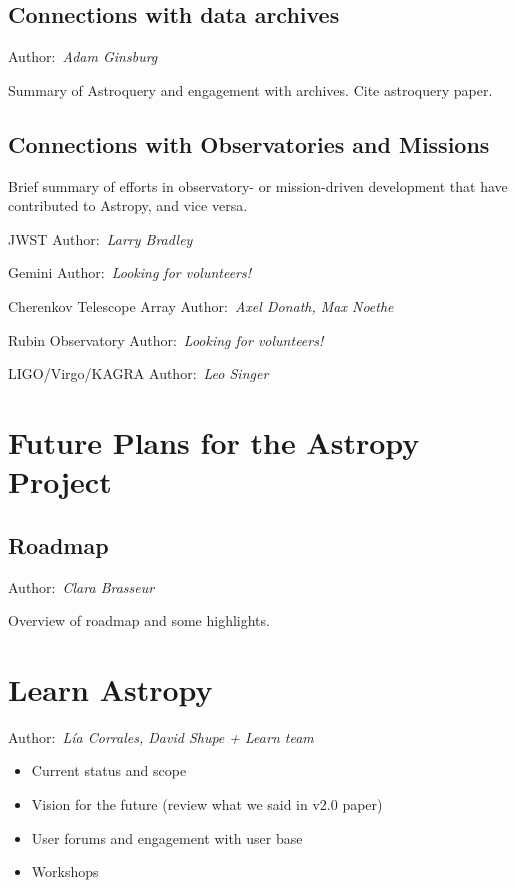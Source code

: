 \documentclass[modern]{aastex631}
\newcommand{\secauthor}[1]{{\color{blue}Author:~\textit{#1}}}
\newcommand{\secunfilled}{{\color{red}Author:~\textit{Looking for volunteers!}}}
\begin{document}
\subsection{Connections with data archives}

\secauthor{Adam Ginsburg}

Summary of Astroquery and engagement with archives. Cite astroquery paper.

\subsection{Connections with Observatories and Missions}

Brief summary of efforts in observatory- or mission-driven development that have
contributed to Astropy, and vice versa.

JWST
\secauthor{Larry Bradley}

Gemini
\secunfilled

Cherenkov Telescope Array
\secauthor{Axel Donath, Max Noethe}

Rubin Observatory
\secunfilled

LIGO/Virgo/KAGRA
\secauthor{Leo Singer}
\section{Future Plans for the Astropy Project} \label{sec:future}

\subsection{Roadmap}

\secauthor{Clara Brasseur}

Overview of roadmap and some highlights.

\section{Learn Astropy} \label{sec:learn}

\secauthor{Lía Corrales, David Shupe + Learn team}

\begin{itemize}
\item Current status and scope
\item Vision for the future (review what we said in v2.0 paper)
\item User forums and engagement with user base
\item Workshops
\end{itemize}
\end{document}
